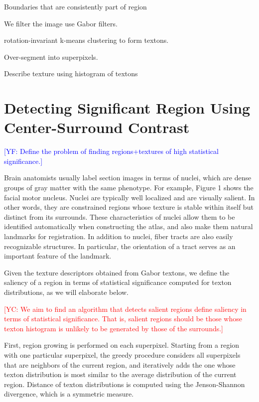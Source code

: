 \documentclass{llncs}
\newcommand{\authcmt}[2]{\textcolor{#1}{#2}}
\newcommand{\yuncong}[1]{\authcmt{red}{[YC: #1]}}
\newcommand{\yoav}[1]{\authcmt{blue}{[YF: #1]}}
\begin{document}
  Boundaries that are consistently part of region

We filter the image use Gabor filters.






rotation-invariant k-means clustering to form textons.

Over-segment into superpixels.

Describe texture using histogram of textons

\section{Detecting Significant Region Using Center-Surround Contrast}

\yoav{Define the problem of finding regions+textures of high
  statistical significance.}


Brain anatomists usually label section images in terms of nuclei, which are dense groups of gray matter with the same phenotype. For example, Figure 1 shows the facial motor nucleus. Nuclei are typically well localized and are visually salient. In other words, they are constrained regions whose texture is stable within itself but distinct from its surrounds. These characteristics of nuclei allow them to be identified automatically when constructing the atlas, and also make them natural landmarks for registration. In addition to nuclei, fiber tracts are also easily recognizable structures. In particular, the orientation of a tract serves as an important feature of the landmark.

Given the texture descriptors obtained from Gabor textons, we define the saliency of a region in terms of statistical significance computed for texton distributions, as we will elaborate below.
 
\yuncong{We aim to find an algorithm that detects salient regions
define saliency in terms of statistical significance. That is, salient regions should be those whose texton histogram is unlikely to be generated by those of the surrounds.}
 
First, region growing is performed on each superpixel. Starting from a region with one particular superpixel, the greedy procedure considers all superpixels that are neighbors of the current region, and iteratively adds the one whose texton distribution is most similar to the average distribution of the current region. Distance of texton distributions is computed using the Jenson-Shannon divergence, which is a symmetric measure.
\end{document}
